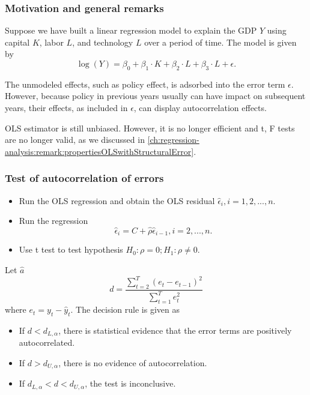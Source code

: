 \begin{refsection}
\subsubsection{Motivation and general remarks}

\begin{remark}
Suppose we have built a linear regression model to explain the GDP $Y$ using capital $K$, labor $L$, and technology $L$ over a period of time. The model is given by
$$\log(Y) = \beta_0 + \beta_1 \cdot K + \beta_2 \cdot L + \beta_3 \cdot L + \epsilon.$$

The unmodeled effects, such as policy effect, is adsorbed into the error term $\epsilon$. However, because policy in previous years usually can have impact on subsequent years, their effects, as included in $\epsilon$, can display autocorrelation effects.		
\end{remark}

\begin{remark}
	OLS estimator is still unbiased. However, it is no longer efficient and t, F tests are no longer valid, as we discussed in \autoref{ch:regression-analysis:remark:propertiesOLSwithStructuralError}.
\end{remark}
\subsubsection{Test of autocorrelation of errors}



\begin{method}\cite[417]{wooldridge2015introductory}\hfill
\begin{itemize}
	\item Run the OLS regression and obtain the OLS residual $\hat{\epsilon}_i,i=1,2,...,n$.
	\item Run the regression
	$$\hat{\epsilon}_i = C + \hat{\rho}\hat{\epsilon}_{i-1},i=2,...,n.$$
	\item Use t test to test hypothesis $H_0: \rho = 0; H_1: \rho \neq 0$.
\end{itemize}	
\end{method}






\begin{method}
Let $\hat{a}$	
	$$d = \frac{\sum_{t=2}^T (e_t - e_{t-1})^2}{\sum_{t=1}^T e_t^2}$$
	where $e_t = y_t - \hat{y}_t$.
	The decision rule is given as
	\begin{itemize}
		\item 	If $d < d_{L,\alpha}$, there is statistical evidence that the error terms are positively autocorrelated.
		\item 	If $d > d_{U,\alpha}$, there is no evidence of autocorrelation.
		\item 	If $d_{L,\alpha} < d < d_{U,\alpha}$, the test is inconclusive.
	\end{itemize}
\end{method}


\end{refsection}
